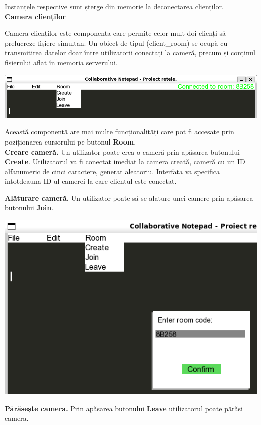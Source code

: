 \documentclass[runningheads]{llncs}
\begin{document}
Instanțele respective sunt șterge din memorie la deconectarea clienților.
\\

{\bf \large Camera clienților}

Camera clienților este componenta care permite celor mult doi clienți să prelucreze fișiere simultan.
Un obiect de tipul (client\_room) se ocupă cu transmitirea datelor doar între utilizatorii conectați la cameră,
precum și conținul fișierului aflat în memoria serverului.

\includegraphics[scale=0.47]{camera.png}

Această componentă are mai multe funcționalități care pot fi accesate prin poziționarea cursorului pe butonul {\bf Room}.
\\

{\bf Creare cameră.} Un utilizator poate crea o cameră prin apăsarea butonului {\bf Create}. Utilizatorul va fi conectat imediat la camera creată,
cameră cu un ID alfa\-numeric de cinci caractere, generat aleatoriu. Interfața va specifica întotdeauna ID-ul camerei la care clientul este conectat.


{\bf Alăturare cameră.} Un utilizator poate să se alature unei camere prin apăsarea butonului {\bf Join}.

\includegraphics[scale=0.421]{camera2.png}

{\bf Părăsește camera.} Prin apăsarea butonului {\bf Leave} utilizatorul poate părăsi camera.
\end{document}
